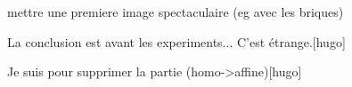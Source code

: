 mettre une premiere image spectaculaire (eg avec les briques)

La conclusion est avant les experiments... C'est étrange.[hugo]

Je suis pour supprimer la partie (homo->affine)[hugo]
